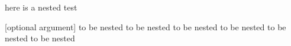 here is a nested test
\begin{one}


	[optional argument]
	to be nested to be nested
	to be nested to be nested
	to be nested to be nested
\end{one}
